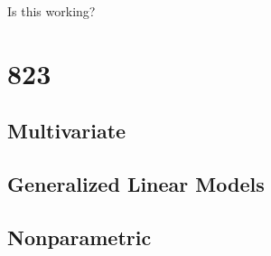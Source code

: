 \documentclass[
]{book}
\begin{document}
Is this working?

\hypertarget{section-2}{%
\chapter{823}\label{section-2}}

\hypertarget{multivariate}{%
\section{Multivariate}\label{multivariate}}

\hypertarget{generalized-linear-models}{%
\section{Generalized Linear Models}\label{generalized-linear-models}}

\hypertarget{nonparametric}{%
\section{Nonparametric}\label{nonparametric}}

  
\end{document}
